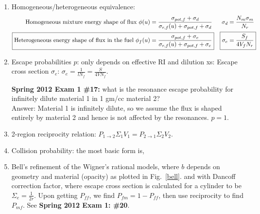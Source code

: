 \documentclass{school-22.211-notes}
\begin{document}
\clearpage
{} 
  \begin{enumerate}
    \item Homogeneous/heterogeneous equivalence: 
      \begin{align*}
        \mbox{Homogeneous mixture energy shape of flux } \phi(u) &= \frac{\sigma_{pot, f} + \sigma_d}{\sigma_{r,f} (u) + \sigma_{pot, f} + \sigma_d}   & \sigma_d &= \frac{N_m \sigma_m}{N_r}  \\
       \Aboxed{ \mbox{Heterogeneous energy shape of flux in the fuel } \phi_f(u) &= \frac{\sigma_{pot, f} + \sigma_e}{\sigma_{r,f} (u) + \sigma_{pot, f} + \sigma_e}}   & \Aboxed{ \sigma_e &= \frac{S_f}{4 V_f N_r}  }
      \end{align*}

    \item Escape probabilities $p$: only depends on effective RI and dilution xs: 
      Escape cross section $\sigma_e$:      $ \sigma_e = \frac{1}{l N_f} = \frac{S}{4V N_f}$. 

      \textbf{Spring 2012 Exam 1 \#17:} what is the resonance escape probability for infinitely dilute material 1 in 1 gm/cc material 2? \\ 
      Answer: Material 1 is infinitely dilute, so we assume the flux is shaped entirely by material 2 and hence is not affected by the resonances. $p = 1$. 
 
    \item 2-region reciprocity relation: $\displaystyle \boxed{ P_{1\to 2} \Sigma_1 V_1 = P_{2\to 1} \Sigma_2 V_2}$. 

    \item Collision probability: the most basic form is, 

    \item Bell's refinement of the Wigner's rational models, where $b$ depends on geometry and material (opacity) as plotted in Fig.~\ref{bell}.
      and with Dancoff correction factor, 
      where escape cross section is calculated for a cylinder to be $\Sigma_e = \frac{1}{2r}$.  Upon getting $P_{ff}$, we find $P_{fm} = 1 - P_{ff}$, then use reciprocity to find $P_{mf}$. See \textbf{Spring 2012 Exam 1: \#20}. 


\end{enumerate}
\end{document}
